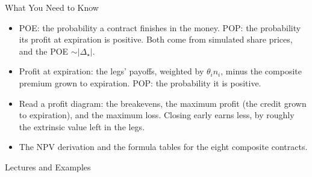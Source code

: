 \documentclass[aspectratio=169,11pt]{beamer}
\newcommand{\repo}{https://github.com/varnerlab/CHEME-5660-CourseRepository-Fall-2026/blob/main/lectures/week-10/L10b}
\newcommand{\repoa}{https://github.com/varnerlab/CHEME-5660-CourseRepository-Fall-2026/blob/main/lectures/week-10/L10a}
\begin{document}
\begin{frame}{What You Need to Know}
  \vspace{0.3em}
  {\large\textbf{}}
  \begin{itemize}\setlength{\itemsep}{0.4em}
    \item POE: the probability a contract finishes in the money. POP: the
      probability its profit at expiration is positive. Both come from simulated
      share prices, and the POE $\sim|\Delta_{\star}|$.
    \item Profit at expiration: the legs' payoffs, weighted by $\theta_{i}n_{i}$,
      minus the composite premium grown to expiration. POP: the probability it is
      positive.
    \item Read a profit diagram: the breakevens, the maximum profit (the credit
      grown to expiration), and the maximum loss. Closing early earns less, by
      roughly the extrinsic value left in the legs.
  \end{itemize}

  \vspace{0.5em}
  {\large\textbf{} }
  \begin{itemize}\setlength{\itemsep}{0.3em}
    \item The NPV derivation and the formula tables for the eight composite
      contracts.
  \end{itemize}
\end{frame}

\begin{frame}{Lectures and Examples}
  \vspace{0.3em}
  {\normalsize\textbf{}\par\small
  \href{\repo/CHEME-5660-L10b-Lecture-POP-POE-Delta-CompositeContracts-Fall-2026.ipynb}{}}

  \vspace{0.6em}
  {\normalsize\textbf{}\par\small
  \href{\repoa/CHEME-5660-L10a-Example-Greeks-PutCall-Fall-2026.ipynb}{}}

  \vspace{0.45em}
  {\normalsize\textbf{}\par\small
  \href{\repoa/CHEME-5660-L10a-Example-POE-POP-Call-Fall-2026.ipynb}{}}

  \vspace{0.45em}
  {\normalsize\textbf{}\par\small
  \href{\repo/CHEME-5660-L10b-Example-Delta-VerticalSpread-Fall-2026.ipynb}{}}

  \vspace{0.45em}
  {\normalsize\textbf{}\par\small
  \href{\repo/CHEME-5660-L10b-Example-Straddle-AMD-Earnings-Fall-2026.ipynb}{}}
\end{frame}
\end{document}
